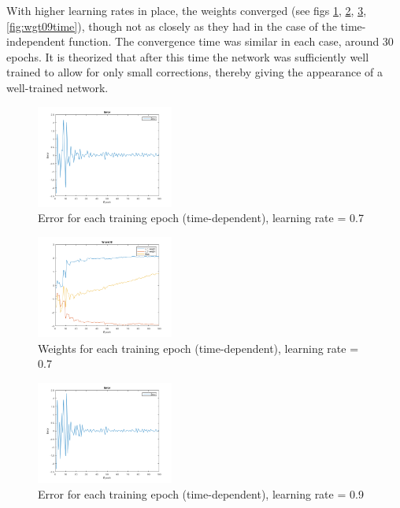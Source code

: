 \documentclass{IEEEtran}
\begin{document}
With higher learning rates in place, the weights converged (see figs \ref{fig:err07time}, \ref{fig:wgt07time}, \ref{fig:err09time}, \ref{fig:wgt09time}), though not as closely as they had in the case of the time-independent function. The convergence time was similar in each case, around 30 epochs. It is theorized that after this time the network was sufficiently well trained to allow for only small corrections, thereby giving the appearance of a well-trained network.

\begin{centering}
\begin{figure}
\begin{center}
	\includegraphics[width=0.4\textwidth]{error_time_07lr}
	\caption{Error for each training epoch (time-dependent), learning rate = 0.7\label{fig:err07time}}
\end{center}
\end{figure}
\end{centering}

\begin{centering}
\begin{figure}
\begin{center}
	\includegraphics[width=0.4\textwidth]{weights_time_07lr}
	\caption{Weights for each training epoch (time-dependent), learning rate = 0.7\label{fig:wgt07time}}
\end{center}
\end{figure}
\end{centering}

\begin{centering}
\begin{figure}
\begin{center}
	\includegraphics[width=0.4\textwidth]{error_time_09lr}
	\caption{Error for each training epoch (time-dependent), learning rate = 0.9\label{fig:err09time}}
\end{center}
\end{figure}
\end{centering}
\end{document}
